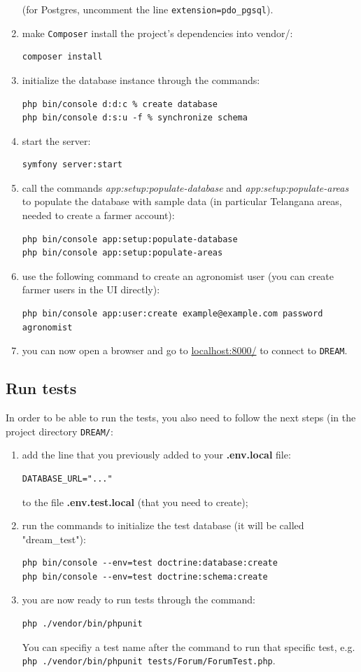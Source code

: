 \documentclass{article}
\begin{document}
\begin{enumerate}
(for Postgres, uncomment the line \verb|extension=pdo_pgsql|).
    \item make \verb|Composer| install the project's dependencies into vendor/:
    \begin{verbatim}
composer install
    \end{verbatim}
\item initialize the database instance through the commands:
    \begin{verbatim}
php bin/console d:d:c % create database
php bin/console d:s:u -f % synchronize schema
    \end{verbatim}
\item start the server:
    \begin{verbatim}
symfony server:start
    \end{verbatim}
\item call the commands \textit{app:setup:populate-database} and \textit{app:setup:populate-areas} to populate the database with sample data (in particular Telangana areas, needed to create a farmer account):
    \begin{verbatim}
php bin/console app:setup:populate-database
php bin/console app:setup:populate-areas
    \end{verbatim}
\item use the following command to create an agronomist user (you can create farmer users in the UI directly):
    \begin{verbatim}
php bin/console app:user:create example@example.com password agronomist
    \end{verbatim}
\item you can now open a browser and go to \url{localhost:8000/} to connect to \verb|DREAM|.
\end{enumerate}
\subsection{Run tests}
In order to be able to run the tests, you also need to follow the next steps (in the project directory \verb|DREAM/|:
\begin{enumerate}
    \item add the line that you previously added to your \textbf{.env.local} file:
\begin{verbatim}
DATABASE_URL="..."
\end{verbatim}
to the file \textbf{.env.test.local} (that you need to create);
\item run the commands to initialize the test database (it will be called "dream\_test"):
\begin{verbatim}
php bin/console --env=test doctrine:database:create
php bin/console --env=test doctrine:schema:create
\end{verbatim}
\item you are now ready to run tests through the command:
\begin{verbatim}
php ./vendor/bin/phpunit
\end{verbatim}
You can specifiy a test name after the command to run that specific test, e.g. \verb|php ./vendor/bin/phpunit tests/Forum/ForumTest.php|.
\end{enumerate}
\newpage
\end{document}
